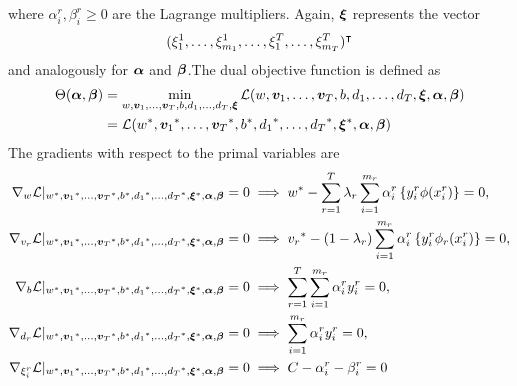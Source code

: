 where $\alpha_i^r, \beta_i^r \geq 0$ are the Lagrange multipliers. Again, $\bm{\xi}$ represents the vector $$(\xi_1^1, \ldots, \xi_{m_1}^1, \ldots, \xi_1^T, \ldots, \xi_{m_T}^T)^\intercal$$ and analogously for $\bm{\alpha}$ and $\bm{\beta}$.The dual objective function is defined as 
\begin{equation}\nonumber
    \begin{aligned}
         \Theta(\bm{\alpha}, \bm{\beta}) &=  \min_{{w}, \bm{v}_1, \ldots, \bm{v}_T, b, d_1, \ldots, d_T, \bm{\xi}} \mathcal{L}({w}, \bm{v}_1, \ldots, \bm{v}_T, b, d_1, \ldots, d_T, \bm{\xi}, \bm{\alpha}, \bm{\beta}) \\
         &= \mathcal{L}({{w}}^*, {\bm{v}_1}^*, \ldots, {\bm{v}_T}^*, {b}^*, {d_1}^*, \ldots, {d_T}^*, {\bm{\xi}}^*, \bm{\alpha}, \bm{\beta})
    \end{aligned}    
\end{equation}
The gradients with respect to the primal variables are
\begin{align}
    \grad_{{w}} \lagr \vert_{\optim{{w}}, \optim{\fv{v}_1}, \ldots, \optim{\fv{v}_\ntasks}, \optim{b}, \optim{d_1}, \ldots, \optim{d_\ntasks}, \optim{\fv{\xi}}, {\fv{\alpha}}, {\fv{\beta}}} = 0  &\implies \optim{{w}} - \sum_{r= 1}^\ntasks \lambda_r \sum_{i=1}^{m_r} {\alpha_i^r} \left\lbrace y_i^r \phi(x_i^r) \right\rbrace = 0 , \label{eq:common_repr_conv} \\
    \grad_{{v}_r} \lagr \vert_{\optim{{w}}, \optim{\fv{v}_1}, \ldots, \optim{\fv{v}_\ntasks}, \optim{b}, \optim{d_1}, \ldots, \optim{d_\ntasks}, \optim{\fv{\xi}}, {\fv{\alpha}}, {\fv{\beta}}} = 0 &\implies \optim{{v}_r} - (1 - \lambda_r) \sum_{i=1}^{m_r} {\alpha_i^r} \left\lbrace y_i^r \phi_r(x_i^r) \right\rbrace = 0 , \label{eq:specific_repr_conv} \\
    \grad_{b} \lagr \vert_{\optim{{w}}, \optim{\fv{v}_1}, \ldots, \optim{\fv{v}_\ntasks}, \optim{b}, \optim{d_1}, \ldots, \optim{d_\ntasks}, \optim{\fv{\xi}}, {\fv{\alpha}}, {\fv{\beta}}} = 0  &\implies \sum_{r= 1}^T \sum_{i=1}^{m_r} {\alpha_i^r} y_i^r = 0 , \label{eq:specific_eqconstr_conv}  \\
    \grad_{{d}_r} \lagr \vert_{\optim{{w}}, \optim{\fv{v}_1}, \ldots, \optim{\fv{v}_\ntasks}, \optim{b}, \optim{d_1}, \ldots, \optim{d_\ntasks}, \optim{\fv{\xi}}, {\fv{\alpha}}, {\fv{\beta}}} = 0 &\implies \sum_{i=1}^{m_r} {\alpha_i^r} y_i^r = 0 , \label{eq:common_eqconstr_conv} \\
    \grad_{\xi_i^r} \lagr \vert_{\optim{{w}}, \optim{\fv{v}_1}, \ldots, \optim{\fv{v}_\ntasks}, \optim{b}, \optim{d_1}, \ldots, \optim{d_\ntasks}, \optim{\fv{\xi}}, {\fv{\alpha}}, {\fv{\beta}}} = 0 &\implies C - {\alpha_i^r} - {\beta_i^r} = 0 \label{eq:xi_feas_conv}
\end{align}
